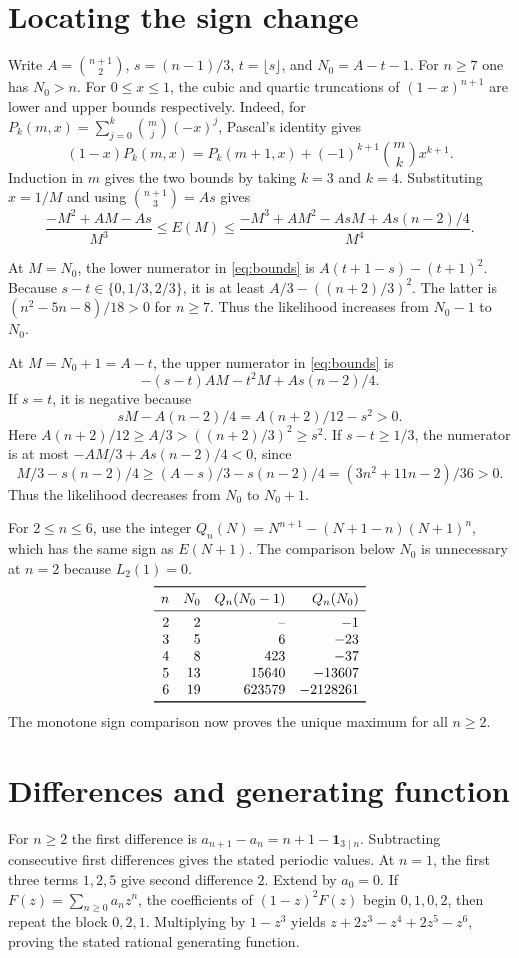 \documentclass[11pt,letterpaper]{article}
\begin{document}
\section{Locating the sign change}
Write $A=\binom{n+1}{2}$, $s=(n-1)/3$, $t=\lfloor s\rfloor$, and $N_0=A-t-1$.
For $n\geq7$ one has $N_0>n$. For $0\leq x\leq1$, the cubic and quartic
truncations of $(1-x)^{n+1}$ are lower and upper bounds respectively.
Indeed, for $P_k(m,x)=\sum_{j=0}^{k}\binom mj(-x)^j$, Pascal's identity gives
\[
 (1-x)P_k(m,x)=P_k(m+1,x)+(-1)^{k+1}\binom mk x^{k+1}.
\]
Induction in $m$ gives the two bounds by taking $k=3$ and $k=4$.
Substituting $x=1/M$ and using $\binom{n+1}{3}=As$ gives
\begin{equation}\label{eq:bounds}
 \frac{-M^2+AM-As}{M^3}\leq E(M)\leq
 \frac{-M^3+AM^2-AsM+As(n-2)/4}{M^4}.
\end{equation}

At $M=N_0$, the lower numerator in \eqref{eq:bounds} is
$A(t+1-s)-(t+1)^2$. Because $s-t\in\{0,1/3,2/3\}$, it is at least
$A/3-((n+2)/3)^2$. The latter is $(n^2-5n-8)/18>0$ for $n\geq7$.
Thus the likelihood increases from $N_0-1$ to $N_0$.

At $M=N_0+1=A-t$, the upper numerator in \eqref{eq:bounds} is
\[
 -(s-t)AM-t^2M+As(n-2)/4.
\]
If $s=t$, it is negative because
\[
 sM-A(n-2)/4=A(n+2)/12-s^2>0.
\]
Here $A(n+2)/12\geq A/3>((n+2)/3)^2\geq s^2$. If $s-t\geq1/3$, the
numerator is at most $-AM/3+As(n-2)/4<0$, since
\[
 M/3-s(n-2)/4\geq (A-s)/3-s(n-2)/4=(3n^2+11n-2)/36>0.
\]
Thus the likelihood decreases from $N_0$ to $N_0+1$.

For $2\leq n\leq6$, use the integer
$Q_n(N)=N^{n+1}-(N+1-n)(N+1)^n$, which has the same sign as $E(N+1)$.
The comparison below $N_0$ is unnecessary at $n=2$ because $L_2(1)=0$.
\[
\begin{array}{rrrr}
\toprule
n&N_0&Q_n(N_0-1)&Q_n(N_0)\\
\midrule
2&2&\text{--}&-1\\
3&5&6&-23\\
4&8&423&-37\\
5&13&15640&-13607\\
6&19&623579&-2128261\\
\bottomrule
\end{array}
\]
The monotone sign comparison now proves the unique maximum for all $n\geq2$.

\section{Differences and generating function}
For $n\geq2$ the first difference is
$a_{n+1}-a_n=n+1-\mathbf 1_{3\mid n}$. Subtracting consecutive first
differences gives the stated periodic values. At $n=1$, the first three
terms $1,2,5$ give second difference $2$.
Extend by $a_0=0$. If $F(z)=\sum_{n\geq0}a_nz^n$, the coefficients of
$(1-z)^2F(z)$ begin $0,1,0,2$, then repeat the block $0,2,1$.
Multiplying by $1-z^3$ yields $z+2z^3-z^4+2z^5-z^6$, proving the stated
rational generating function.
\end{document}
